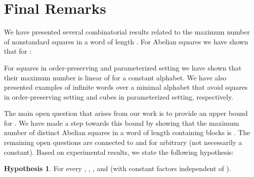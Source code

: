 \documentclass{article}
\theoremstyle{plain}
\theoremstyle{definition}
\newtheorem{hypothesis}[theorem]{Hypothesis}
\theoremstyle{remark}
\begin{document}
  \section{Final Remarks}
  We have presented several combinatorial results related to the maximum number of
  nonstandard squares in a word of length .
  For Abelian squares we have shown that for :
  

  For squares in order-preserving and parameterized setting we have shown
  that their maximum number is linear of  for a constant alphabet.
  We have also presented examples of infinite words over a minimal alphabet that avoid squares in
  order-preserving setting and cubes in parameterized setting, respectively.

  The main open question that arises from our work is to provide an upper bound for .
  We have made a step towards this bound by showing that the maximum number of distinct Abelian squares
  in a word of length  containing  blocks is .
  The remaining open questions are connected to  and 
  for arbitrary  (not necessarily a constant).
  Based on experimental results, we state the following hypothesis:
\begin{hypothesis}
   For every ,
  , , and 
  (with constant factors independent of ).
\end{hypothesis}

\begin{comment}
  A tempting idea effectively used for ordinary squares would be to consider only the \emph{last occurrence}
  of each type of Abelian square and show that the maximum number of such occurrences starting at the same position
  of the word (or sharing the same middle interposition) is small.
  Unfortunately, this number can be large, e.g.,
  the word  of length  contains  different square vectors ,
  each corresponding to a last occurrence of Abelian square at the first position,
  whereas the word  also of length , contains last occurrences of  different
  Abelian squares centered at its center.
  Another idea could be to try to bound the maximum number of nonequivalent (long) Abelian squares in a word of the same length.
  However, this number also can be large, e.g.\ the word  of length 
  contains  nonequivalent Abelian squares of length  (namely, , , \ldots, ).
\end{comment}




\end{document}
